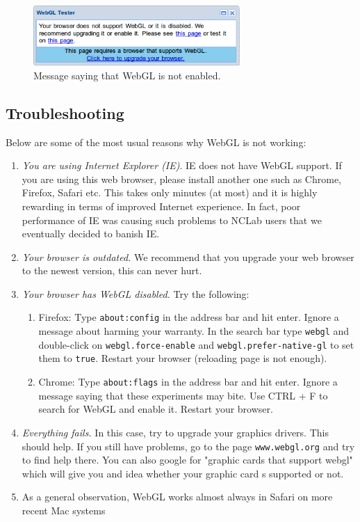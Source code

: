 \documentclass{article}
\begin{document}
\begin{figure}[!ht]
\begin{center}
\includegraphics[width=0.7\textwidth]{img/nowebgl.png}
\end{center}
\vspace{-4mm}
\caption{Message saying that WebGL is not enabled.}
\label{fig:nowebgl}
\end{figure}

\subsection*{Troubleshooting}
\noindent
Below are some of the most usual reasons why WebGL is not working:
\begin{enumerate}
\item {\em You are using Internet Explorer (IE)}. IE does not have WebGL support. If you are using this web browser, please install another 
one such as Chrome, Firefox, Safari etc. This takes only minutes (at most) and it is highly rewarding in terms 
of improved Internet experience. In fact, poor performance of IE was causing such problems to NCLab users that 
we eventually decided to banish IE. 
\item {\em Your browser is outdated.} We recommend that you upgrade your web browser to the newest version, this 
can never hurt. 
\item {\em Your browser has WebGL disabled.} Try the following:
\begin{enumerate}
\item Firefox: Type {\tt about:config} in the address bar and hit enter. Ignore a message about harming your 
      warranty. In the search bar type {\tt webgl} and double-click on {\tt webgl.force-enable} and 
      {\tt webgl.prefer-native-gl} to set them to {\tt true}. Restart your browser (reloading page is not enough).
\item Chrome: Type {\tt about:flags} in the address bar and hit enter. Ignore a message saying that these 
      experiments may bite. Use CTRL + F to search for WebGL and enable it. Restart your browser. 
\end{enumerate}
\item {\em Everything fails.} In this case, try to upgrade your graphics drivers. This should help. If you still have 
problems, go to the page {\tt www.webgl.org} and try to find help there. You can also google for "graphic cards that 
support webgl" which will give you and idea whether your graphic card s supported or not. 
\item As a general observation, WebGL works almost always in Safari on more recent Mac systems  
\end{enumerate}
\end{document}
